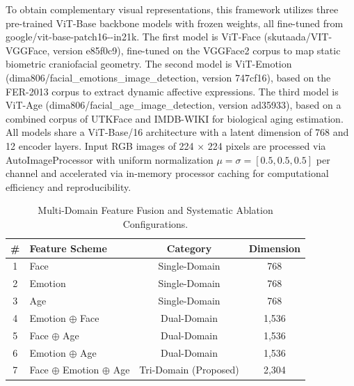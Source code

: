To obtain complementary visual representations, this framework utilizes three pre-trained ViT-Base backbone models with frozen weights, all fine-tuned from google/\allowbreak vit-\allowbreak base-\allowbreak patch16--\allowbreak in21k. The first model is ViT-Face (skutaada/\allowbreak VIT-\allowbreak VGGFace, version e85f0c9), fine-tuned on the VGGFace2 corpus to map static biometric craniofacial geometry. The second model is ViT-Emotion (dima806/\allowbreak facial\_\allowbreak emotions\_\allowbreak image\_\allowbreak detection, version 747cf16), based on the FER-2013 corpus to extract dynamic affective expressions. The third model is ViT-Age (dima806/\allowbreak facial\_\allowbreak age\_\allowbreak image\_\allowbreak detection, version ad35933), based on a combined corpus of UTKFace and IMDB-WIKI for biological aging estimation. All models share a ViT-Base/16 architecture with a latent dimension of 768 and 12 encoder layers. Input RGB images of 224 $\times$ 224 pixels are processed via AutoImageProcessor with uniform normalization $\mu = \sigma = [0.5, 0.5, 0.5]$ per channel and accelerated via in-memory processor caching for computational efficiency and reproducibility.

\begin{table}[htbp]
\caption{Multi-Domain Feature Fusion and Systematic Ablation Configurations.}
\label{tab:2}
\label{tab:II}
\centering
\footnotesize
\setlength{\tabcolsep}{3.5pt}
\begin{tabular}{clcc}
\toprule
\# & Feature Scheme & Category & Dimension \\
\midrule
1 & Face & Single-Domain & 768 \\
2 & Emotion & Single-Domain & 768 \\
3 & Age & Single-Domain & 768 \\
4 & Emotion $\oplus$ Face & Dual-Domain & 1,536 \\
5 & Face $\oplus$ Age & Dual-Domain & 1,536 \\
6 & Emotion $\oplus$ Age & Dual-Domain & 1,536 \\
7 & Face $\oplus$ Emotion $\oplus$ Age & Tri-Domain (Proposed) & 2,304 \\
\bottomrule
\end{tabular}
\end{table}

